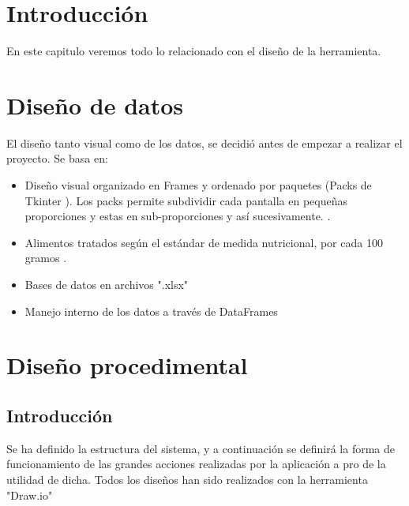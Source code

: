 
\section{Introducción}
En este capitulo veremos  todo lo relacionado con el diseño de la herramienta.
\section{Diseño de datos}
El diseño tanto visual como de los datos, se decidió antes de empezar a realizar el proyecto. Se basa en:
\begin{itemize}
\item Diseño visual organizado en Frames y ordenado por paquetes (Packs de Tkinter \cite{pack}). Los packs permite subdividir cada pantalla en pequeñas proporciones y estas en sub-proporciones y así sucesivamente. .
\item Alimentos tratados según el estándar de medida nutricional, por cada 100 gramos \cite{estandarNutri}.
\item Bases de datos en archivos ".xlsx"
\item Manejo interno de los datos a través de DataFrames
\end{itemize}
\section{Diseño procedimental}
\subsection{Introducción}
Se ha definido la estructura del sistema, y a continuación se definirá la forma de funcionamiento de las grandes acciones realizadas por la aplicación a pro de la utilidad de dicha. Todos los diseños han sido realizados con la herramienta "Draw.io" \cite{herramientoUML}
